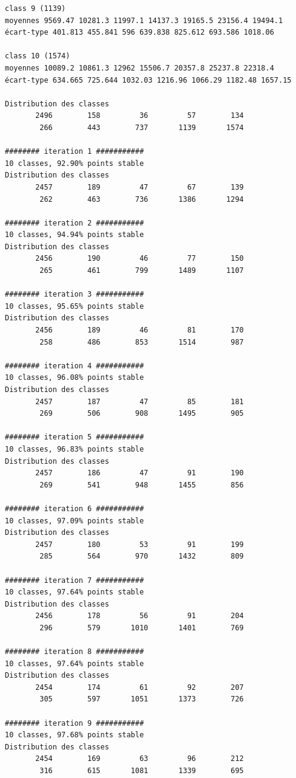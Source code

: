 \documentclass[earth,article,submit,pdftex,moreauthors]{Definitions/mdpi}
\begin{document}
{\begin{scriptsize}
\begin{verbatim}
class 9 (1139)
moyennes 9569.47 10281.3 11997.1 14137.3 19165.5 23156.4 19494.1
écart-type 401.813 455.841 596 639.838 825.612 693.586 1018.06

class 10 (1574)
moyennes 10089.2 10861.3 12962 15506.7 20357.8 25237.8 22318.4
écart-type 634.665 725.644 1032.03 1216.96 1066.29 1182.48 1657.15

Distribution des classes
       2496        158         36         57        134
        266        443        737       1139       1574

######## iteration 1 ###########
10 classes, 92.90% points stable
Distribution des classes
       2457        189         47         67        139
        262        463        736       1386       1294

######## iteration 2 ###########
10 classes, 94.94% points stable
Distribution des classes
       2456        190         46         77        150
        265        461        799       1489       1107

######## iteration 3 ###########
10 classes, 95.65% points stable
Distribution des classes
       2456        189         46         81        170
        258        486        853       1514        987

######## iteration 4 ###########
10 classes, 96.08% points stable
Distribution des classes
       2457        187         47         85        181
        269        506        908       1495        905

######## iteration 5 ###########
10 classes, 96.83% points stable
Distribution des classes
       2457        186         47         91        190
        269        541        948       1455        856

######## iteration 6 ###########
10 classes, 97.09% points stable
Distribution des classes
       2457        180         53         91        199
        285        564        970       1432        809

######## iteration 7 ###########
10 classes, 97.64% points stable
Distribution des classes
       2456        178         56         91        204
        296        579       1010       1401        769

######## iteration 8 ###########
10 classes, 97.64% points stable
Distribution des classes
       2454        174         61         92        207
        305        597       1051       1373        726

######## iteration 9 ###########
10 classes, 97.68% points stable
Distribution des classes
       2454        169         63         96        212
        316        615       1081       1339        695


\end{verbatim}
\end{scriptsize}}
\end{document}
